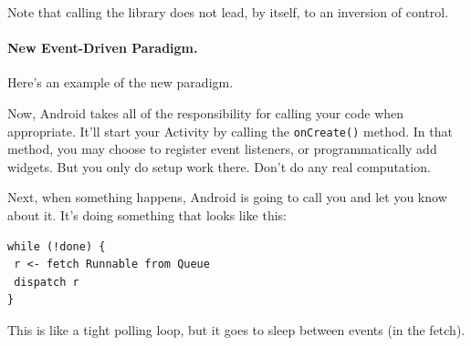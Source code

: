 Note that calling the library does not lead, by itself, to an inversion of control.

\paragraph{New Event-Driven Paradigm.} Here's an example of the new paradigm.

\begin{center}
\end{center}
Now, Android takes all of the responsibility for calling your code when appropriate.
It'll start your Activity by calling the {\tt onCreate()} method. In that method,
you may choose to register event listeners, or programmatically add widgets. But you
only do setup work there. Don't do any real computation.

Next, when something happens, Android is going to call you and let you know about it.
It's doing something that looks like this:

\begin{verbatim}
while (!done) {
 r <- fetch Runnable from Queue
 dispatch r
}
\end{verbatim}

This is like a tight polling loop, but it goes to sleep between events (in the
fetch).







